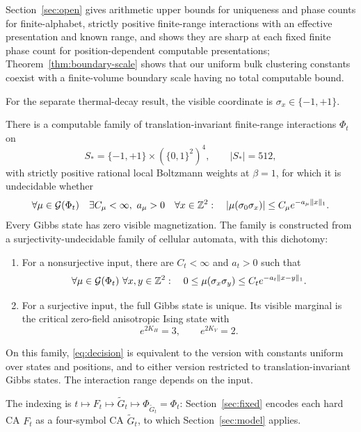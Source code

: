 Section~\ref{sec:open} gives arithmetic upper bounds for uniqueness and phase counts for finite-alphabet, strictly positive finite-range interactions with an effective presentation and known range, and shows they are sharp at each fixed finite phase count for position-dependent computable presentations; Theorem~\ref{thm:boundary-scale} shows that our uniform bulk clustering constants coexist with a finite-volume boundary scale having no total computable bound.

For the separate thermal-decay result, the visible coordinate is $\sigma_x\in\{-1,+1\}$.

\begin{theoremA}\label{thm:main}
There is a computable family of translation-invariant finite-range interactions $\Phi_t$ on
\[
 S_* = \{-1,+1\}\times(\{0,1\}^2)^4,\qquad |S_*|=512,
\]
with strictly positive rational local Boltzmann weights at $\beta=1$, for which it is undecidable whether
\begin{equation}\label{eq:decision}
 \forall\mu\in\mathcal G(\Phi_t)\quad\exists C_\mu<\infty,\ a_\mu>0\quad
 \forall x\in\mathbb Z^2:\quad |\mu(\sigma_0\sigma_x)|\le C_\mu e^{-a_\mu\|x\|_1}.
\end{equation}
Every Gibbs state has zero visible magnetization. The family is constructed from a surjectivity-undecidable family of cellular automata, with this dichotomy:
\begin{enumerate}[label=(\roman*)]
\item For a nonsurjective input, there are $C_t<\infty$ and $a_t>0$ such that
\begin{equation}\label{eq:uniform-decay}
 \forall\mu\in\mathcal G(\Phi_t)\ \forall x,y\in\mathbb Z^2:\quad
 0\le\mu(\sigma_x\sigma_y)\le C_t e^{-a_t\|x-y\|_1}.
\end{equation}
\item For a surjective input, the full Gibbs state is unique. Its visible marginal is the critical zero-field anisotropic Ising state with
\[
 e^{2K_H}=3,\qquad e^{2K_V}=2.
\]
\end{enumerate}
On this family, \eqref{eq:decision} is equivalent to the version with constants uniform over states and positions, and to either version restricted to translation-invariant Gibbs states. The interaction range depends on the input.
\end{theoremA}
The indexing is $t\mapsto F_t\mapsto\widetilde G_t\mapsto\Phi_{\widetilde G_t}=\Phi_t$: Section~\ref{sec:fixed} encodes each hard CA $F_t$ as a four-symbol CA $\widetilde G_t$, to which Section~\ref{sec:model} applies.

